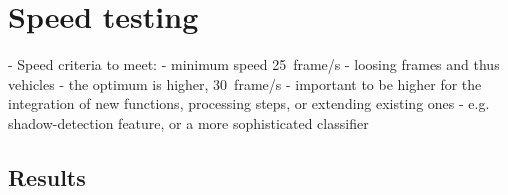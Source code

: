 \section{Speed testing}
- Speed criteria to meet:
	- minimum speed \SI{25}{frame/s}
	- loosing frames and thus vehicles
	- the optimum is higher, \SI{30}{frame/s}
	- important to be higher for the integration of new functions, processing steps, or extending existing ones
	- e.g. shadow-detection feature, or a more sophisticated classifier

\subsection{Results}
